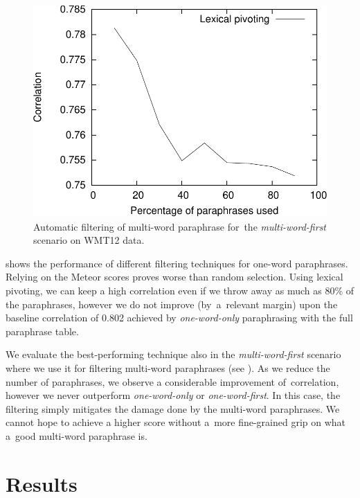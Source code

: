 \begin{figure}[tb]
\begin{center}
\includegraphics[scale=0.55]{../img/filtering-mwe-cropped.pdf}
\caption{Automatic filtering of multi-word paraphrase for~the \textit{multi-word-first} scenario on WMT12 data.}
\label{fig:filtering-mwe}
\end{center}
\end{figure}

 shows the performance of different filtering
techniques for one-word paraphrases. Relying on the Meteor scores proves worse than
random selection. Using lexical pivoting, we can keep a high correlation even 
if we throw away as much as 80\% of the paraphrases, however we do not improve
(by~a~relevant margin) upon the baseline correlation of 0.802 achieved by
\emph{one-word-only} paraphrasing with the full paraphrase table.

We evaluate the best-performing technique also in the \textit{multi-word-first}
scenario where we use it for filtering multi-word paraphrases (see
). As we reduce the number of paraphrases, we observe a
considerable improvement of~correlation, however we never outperform
\textit{one-word-only} or \textit{one-word-first}. In this case, the filtering
simply mitigates the damage done by the multi-word paraphrases. We
cannot hope to achieve a higher score without a~more fine-grained grip on what
a~good multi-word paraphrase is.

\section{Results}
\label{results}


